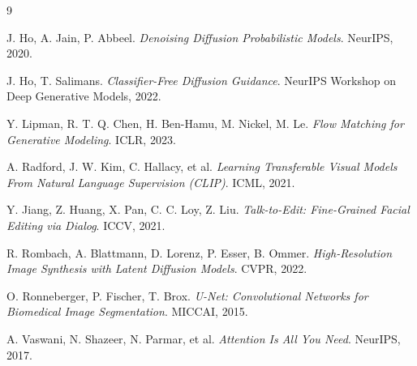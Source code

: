 \begin{thebibliography}{9}

J. Ho, A. Jain, P. Abbeel.
\textit{Denoising Diffusion Probabilistic Models}.
NeurIPS, 2020.

J. Ho, T. Salimans.
\textit{Classifier-Free Diffusion Guidance}.
NeurIPS Workshop on Deep Generative Models, 2022.

Y. Lipman, R. T. Q. Chen, H. Ben-Hamu, M. Nickel, M. Le.
\textit{Flow Matching for Generative Modeling}.
ICLR, 2023.

A. Radford, J. W. Kim, C. Hallacy, et al.
\textit{Learning Transferable Visual Models From Natural Language Supervision (CLIP)}.
ICML, 2021.

Y. Jiang, Z. Huang, X. Pan, C. C. Loy, Z. Liu.
\textit{Talk-to-Edit: Fine-Grained Facial Editing via Dialog}.
ICCV, 2021.

R. Rombach, A. Blattmann, D. Lorenz, P. Esser, B. Ommer.
\textit{High-Resolution Image Synthesis with Latent Diffusion Models}.
CVPR, 2022.

O. Ronneberger, P. Fischer, T. Brox.
\textit{U-Net: Convolutional Networks for Biomedical Image Segmentation}.
MICCAI, 2015.

A. Vaswani, N. Shazeer, N. Parmar, et al.
\textit{Attention Is All You Need}.
NeurIPS, 2017.

\end{thebibliography}
